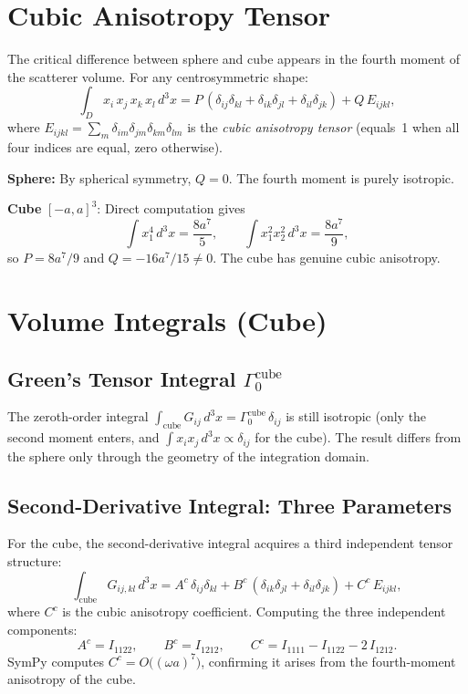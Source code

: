 \section{Cubic Anisotropy Tensor}

The critical difference between sphere and cube appears in the fourth
moment of the scatterer volume.  For any centrosymmetric shape:
\begin{equation}
  \int_D x_i\,x_j\,x_k\,x_l\,d^3x
  = P\,(\delta_{ij}\delta_{kl} + \delta_{ik}\delta_{jl}
    + \delta_{il}\delta_{jk})
  + Q\,E_{ijkl},
\label{eq:4thmoment}
\end{equation}
where $E_{ijkl} = \sum_m \delta_{im}\delta_{jm}\delta_{km}\delta_{lm}$ is
the \emph{cubic anisotropy tensor} (equals~1 when all four indices are
equal, zero otherwise).

\textbf{Sphere:}  By spherical symmetry, $Q=0$.  The fourth moment is
purely isotropic.

\textbf{Cube} $[-a,a]^3$:  Direct computation gives
\begin{equation}
  \int x_1^4\,d^3x = \frac{8a^7}{5}, \qquad
  \int x_1^2 x_2^2\,d^3x = \frac{8a^7}{9},
\label{eq:cube4th}
\end{equation}
so $P = 8a^7/9$ and $Q = -16a^7/15 \neq 0$.  The cube has genuine cubic
anisotropy.


\section{Volume Integrals (Cube)}

\subsection{Green's Tensor Integral $\Gamma_0^{\text{cube}}$}

The zeroth-order integral
$\int_{\text{cube}} G_{ij}\,d^3x = \Gamma_0^{\text{cube}}\,\delta_{ij}$
is still isotropic (only the second moment enters, and
$\int x_i x_j\,d^3x \propto \delta_{ij}$ for the cube).  The result
differs from the sphere only through the geometry of the integration domain.

\subsection{Second-Derivative Integral: Three Parameters}

For the cube, the second-derivative integral acquires a third independent
tensor structure:
\begin{equation}
  \int_{\text{cube}} G_{ij,kl}\,d^3x
  = A^c\,\delta_{ij}\delta_{kl}
  + B^c\,(\delta_{ik}\delta_{jl} + \delta_{il}\delta_{jk})
  + C^c\,E_{ijkl},
\label{eq:ABCcube}
\end{equation}
where $C^c$ is the cubic anisotropy coefficient.  Computing the three
independent components:
\begin{equation}
  A^c = I_{1122}, \qquad
  B^c = I_{1212}, \qquad
  C^c = I_{1111} - I_{1122} - 2\,I_{1212}.
\label{eq:ABCdef}
\end{equation}
SymPy computes $C^c = O\bigl((\omega a)^7\bigr)$, confirming it arises
from the fourth-moment anisotropy of the cube.


